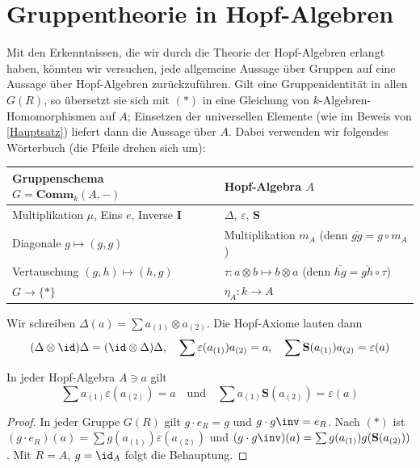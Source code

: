 \documentclass[11pt]{article}
\newcommand{\Comm}{\mathbf{Comm}}
\newcommand{\Sbold}{\mathbf{S}}
\newcommand{\Ibold}{\mathbf{I}}
\begin{document}
\newpage




















\section{Gruppentheorie in Hopf-Algebren}

Mit den Erkenntnissen, die wir durch die Theorie der Hopf-Algebren erlangt haben, könnten wir versuchen, jede allgemeine Aussage über Gruppen auf eine Aussage über Hopf-Algebren zurückzuführen. Gilt eine Gruppenidentität in allen $G(R)$,
so übersetzt sie sich mit $(*)$ in eine Gleichung von $k$-Algebren-Homomorphismen auf $A$; Einsetzen der universellen Elemente
(wie im Beweis von \ref{Hauptsatz}) liefert dann die Aussage über $A$. Dabei verwenden wir folgendes Wörterbuch (die Pfeile drehen sich um):
\begin{center}
    \renewcommand{\arraystretch}{1.3}
\begin{tabularx}{\linewidth}{Y||Y}
    Gruppenschema $G=\Comm_k(A,-)$ & Hopf-Algebra $A$\\ \hline
    Multiplikation $\mu$, Eins $e$, Inverse $\Ibold$ & $\Delta$, $\varepsilon$, $\Sbold$\\
    Diagonale $g\mapsto(g,g)$ & Multiplikation $m_A$ \quad (denn $\overline{gg}=g\circ m_A$)\\
    Vertauschung $(g,h)\mapsto(h,g)$ & $\tau: a\otimes b\mapsto b\otimes a$ \quad (denn $\overline{hg}=\overline{gh}\circ\tau$)\\
    $G\to\{*\}$ & $\eta_A: k\to A$
\end{tabularx}
\end{center}
Wir schreiben $\Delta(a)=\sum a_{(1)}\otimes a_{(2)}$. Die Hopf-Axiome lauten dann
$$(\Delta\otimes\id)\Delta=(\id\otimes\Delta)\Delta,\quad \sum\varepsilon(a_{(1)})a_{(2)}=a, \quad \sum\Sbold(a_{(1)})a_{(2)}=\varepsilon(a)$$

\begin{corollary} \Theorem
    In jeder Hopf-Algebra $A\ni a$ gilt $$\sum a_{(1)}\varepsilon(a_{(2)}) = a \quad \text{und}\quad \sum a_{(1)}\Sbold(a_{(2)}) = \varepsilon(a)$$
\end{corollary}
\begin{proof}
    In jeder Gruppe $G(R)$ gilt $g\cdot e_R = g$ und $g\cdot g\inv = e_R$. Nach $(*)$ ist
    $(g\cdot e_R)(a) = \sum g(a_{(1)})\varepsilon(a_{(2)})$ und $(g\cdot g\inv)(a) = \sum g(a_{(1)})g(\Sbold(a_{(2)}))$.
    Mit $R=A$, $g=\id_A$ folgt die Behauptung.
\end{proof}
\end{document}
